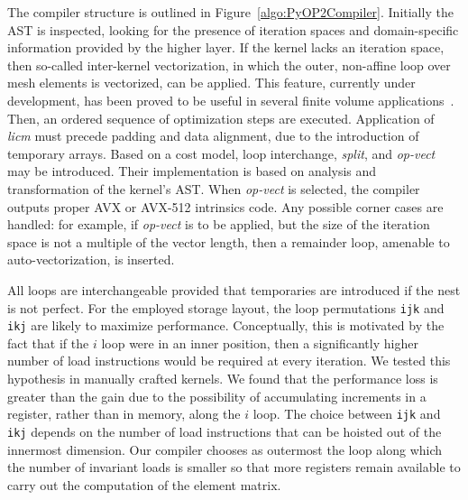 \documentclass[conference]{IEEEtran}
\begin{document}
The compiler structure is outlined in Figure~\ref{algo:PyOP2Compiler}. Initially the AST is inspected, looking for the presence of iteration spaces and domain-specific information provided by the higher layer. If the kernel lacks an iteration space, then so-called inter-kernel vectorization, in which the outer, non-affine loop over mesh elements is vectorized, can be applied. This feature, currently under development, has been proved to be useful in several finite volume applications~\cite{inter-kernel-vect}. Then, an ordered sequence of optimization steps are executed. Application of \emph{licm} must precede padding and data alignment, due to the introduction of temporary arrays. Based on a cost model, loop interchange, \emph{split}, and \emph{op-vect} may be introduced. Their implementation is based on analysis and transformation of the kernel's AST. When \emph{op-vect} is selected, the compiler outputs proper AVX or AVX-512 intrinsics code. Any possible corner cases are handled: for example, if \emph{op-vect} is to be applied, but the size of the iteration space is not a multiple of the vector length, then a remainder loop, amenable to auto-vectorization, is inserted.

All loops are interchangeable provided that temporaries are introduced if the nest is not perfect. For the employed storage layout, the loop permutations \texttt{ijk} and \texttt{ikj} are likely to maximize performance. Conceptually, this is motivated by the fact that if the $i$ loop were in an inner position, then a significantly higher number of load instructions would be required at every iteration. We tested this hypothesis in manually crafted kernels. We found that the performance loss is greater than the gain due to the possibility of accumulating increments in a register, rather than in memory, along the $i$ loop. The choice between \texttt{ijk} and \texttt{ikj} depends on the number of load instructions that can be hoisted out of the innermost dimension. Our compiler chooses as outermost the loop along which the number of invariant loads is smaller so that more registers remain available to carry out the computation of the element matrix.
\end{document}
